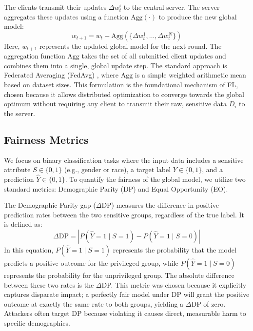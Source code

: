 \documentclass[journal]{IEEEtran}
\begin{document}
The clients transmit their updates $\Delta w_t^i$ to the central server. The server aggregates these updates using a function $\text{Agg}(\cdot)$ to produce the new global model:
\begin{equation}
w_{t+1} = w_t + \text{Agg}\left(\{\Delta w_t^1, \dots, \Delta w_t^N\}\right)
\end{equation}
Here, $w_{t+1}$ represents the updated global model for the next round. The aggregation function $\text{Agg}$ takes the set of all submitted client updates and combines them into a single, global update step. The standard approach is Federated Averaging (FedAvg) \cite{mcmahan2017communication}, where $\text{Agg}$ is a simple weighted arithmetic mean based on dataset sizes. This formulation is the foundational mechanism of FL, chosen because it allows distributed optimization to converge towards the global optimum without requiring any client to transmit their raw, sensitive data $D_i$ to the server.

\subsection{Fairness Metrics}
We focus on binary classification tasks where the input data includes a sensitive attribute $S \in \{0, 1\}$ (e.g., gender or race), a target label $Y \in \{0, 1\}$, and a prediction $\hat{Y} \in \{0, 1\}$. To quantify the fairness of the global model, we utilize two standard metrics: Demographic Parity (DP) and Equal Opportunity (EO).

The Demographic Parity gap ($\Delta$DP) measures the difference in positive prediction rates between the two sensitive groups, regardless of the true label. It is defined as:
\begin{equation}
\Delta\text{DP} = \left| P(\hat{Y}=1 \mid S=1) - P(\hat{Y}=1 \mid S=0) \right|
\end{equation}
In this equation, $P(\hat{Y}=1 \mid S=1)$ represents the probability that the model predicts a positive outcome for the privileged group, while $P(\hat{Y}=1 \mid S=0)$ represents the probability for the unprivileged group. The absolute difference between these two rates is the $\Delta$DP. This metric was chosen because it explicitly captures disparate impact; a perfectly fair model under DP will grant the positive outcome at exactly the same rate to both groups, yielding a $\Delta$DP of zero. Attackers often target DP because violating it causes direct, measurable harm to specific demographics.
\end{document}
